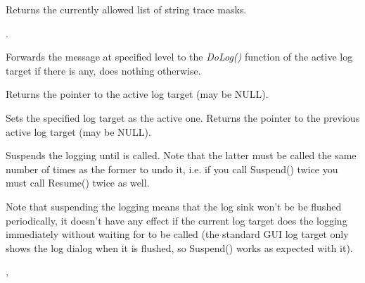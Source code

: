 
Returns the currently allowed list of string trace masks.


.

\label{wxlogonlog}


Forwards the message at specified level to the {\it DoLog()} function of the
active log target if there is any, does nothing otherwise.

\label{wxloggetactivetarget}


Returns the pointer to the active log target (may be NULL).

\label{wxlogsetactivetarget}


Sets the specified log target as the active one. Returns the pointer to the
previous active log target (may be NULL).

\label{wxlogsuspend}


Suspends the logging until  is called. Note that
the latter must be called the same number of times as the former to undo it,
i.e. if you call Suspend() twice you must call Resume() twice as well.

Note that suspending the logging means that the log sink won't be be flushed
periodically, it doesn't have any effect if the current log target does the
logging immediately without waiting for  to be
called (the standard GUI log target only shows the log dialog when it is
flushed, so Suspend() works as expected with it).


,\\

\label{wxlogresume}


